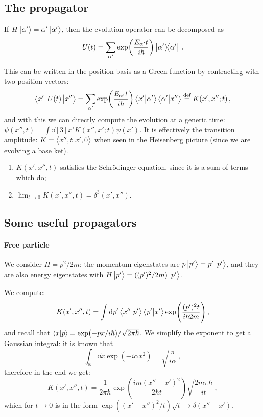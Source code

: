 \documentclass[main.tex]{subfiles}
\begin{document}
\subsection{The propagator}

If \(H \ket{\alpha '} = \alpha ' \ket{\alpha '} \), then the evolution operator can be decomposed as 
%
\begin{equation}
  U (t) = \sum _{\alpha '} \exp(\frac{E_{\alpha '} t}{i \hbar}) \dyad{\alpha '}  
\,.
\end{equation}

This can be written in the position basis as a Green function by contracting with two position vectors: 
%
\begin{equation}
  \bra{x'} U(t) \ket{x''} =
  \sum _{\alpha '} \exp(\frac{E_{\alpha '} t}{i \hbar}) \braket{x'}{\alpha '} \braket{\alpha '}{x''} 
  \overset{\text{def}}{=}  K(x', x''; t)
\,,
\end{equation}
%
and with this we can directly compute the evolution at a generic time: \(\psi (x'', t) =  \int \dd[3]{x'} K(x'', x'; t) \psi (x')\). It is effectively the transition amplitude: \(K = \braket{x'', t}{x', 0} \) when seen in the Heisenberg picture (since we are evolving a base ket).

\begin{enumerate}
    \item \(K(x', x'', t)\) satisfies the Schrödinger equation, since it is a sum of terms which do;
    \item \(\lim_{t \rightarrow 0} K(x', x'', t) = \delta^3 (x', x'')\).
\end{enumerate}

\subsection{Some useful propagators}

\paragraph{Free particle}

We consider \(H = p^2/2m\); the momentum eigenstates are \(p \ket{p'} = p' \ket{p'} \), and they are also energy eigenstates with \(H \ket{p'}  = ((p')^2/2m) \ket{p'} \).

We compute: 
%
\begin{equation}
  K(x', x'', t) = \int \dd{p'} \braket{x''}{p'} \braket{p'}{x'} \exp(\frac{(p')^2 t}{i \hbar 2m }) 
\,,
\end{equation}
%
and recall that \(\braket{x}{p} = \exp(-px/ i \hbar) / \sqrt{2 \pi \hbar}  \). We simplify the exponent to get a Gaussian integral: it is known that
%
\begin{equation}
  \int _{\mathbb{R}} \dd{x} \exp(- i \alpha x^2) = \sqrt{\frac{\pi}{i \alpha }} 
\,,
\end{equation}
%
therefore in the end we get: 
%
\begin{equation}
  K(x', x'', t) = \frac{1}{2 \pi \hbar} \exp(\frac{im (x'' - x')^2}{2 \hbar t}) \sqrt{\frac{2 m \pi \hbar}{it}} 
\,,
\end{equation}
%
which for \(t \rightarrow 0\) is in the form
\(\exp({(x' - x'')}^2/t) \sqrt{t} \rightarrow \delta (x''- x') \).
\end{document}
